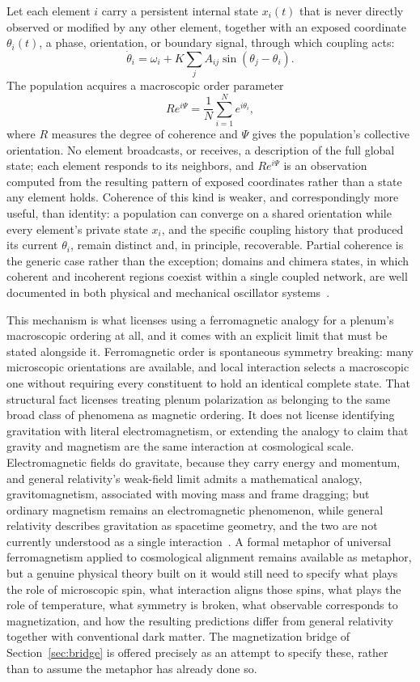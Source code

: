 \documentclass[11pt]{article}
\begin{document}
Let each element $i$ carry a persistent internal state $x_i(t)$ that is never directly observed or modified by any other element, together with an exposed coordinate $\theta_i(t)$, a phase, orientation, or boundary signal, through which coupling acts:
\[
\dot{\theta}_i = \omega_i + K\sum_j A_{ij}\sin(\theta_j - \theta_i).
\]
The population acquires a macroscopic order parameter
\[
Re^{i\Psi} = \frac{1}{N}\sum_{i=1}^{N} e^{i\theta_i},
\]
where $R$ measures the degree of coherence and $\Psi$ gives the population's collective orientation. No element broadcasts, or receives, a description of the full global state; each element responds to its neighbors, and $Re^{i\Psi}$ is an observation computed from the resulting pattern of exposed coordinates rather than a state any element holds. Coherence of this kind is weaker, and correspondingly more useful, than identity: a population can converge on a shared orientation while every element's private state $x_i$, and the specific coupling history that produced its current $\theta_i$, remain distinct and, in principle, recoverable. Partial coherence is the generic case rather than the exception; domains and chimera states, in which coherent and incoherent regions coexist within a single coupled network, are well documented in both physical and mechanical oscillator systems~\cite{panaggio2015}.

This mechanism is what licenses using a ferromagnetic analogy for a plenum's macroscopic ordering at all, and it comes with an explicit limit that must be stated alongside it. Ferromagnetic order is spontaneous symmetry breaking: many microscopic orientations are available, and local interaction selects a macroscopic one without requiring every constituent to hold an identical complete state. That structural fact licenses treating plenum polarization as belonging to the same broad class of phenomena as magnetic ordering. It does not license identifying gravitation with literal electromagnetism, or extending the analogy to claim that gravity and magnetism are the same interaction at cosmological scale. Electromagnetic fields do gravitate, because they carry energy and momentum, and general relativity's weak-field limit admits a mathematical analogy, gravitomagnetism, associated with moving mass and frame dragging; but ordinary magnetism remains an electromagnetic phenomenon, while general relativity describes gravitation as spacetime geometry, and the two are not currently understood as a single interaction~\cite{einsteinonline}. A formal metaphor of universal ferromagnetism applied to cosmological alignment remains available as metaphor, but a genuine physical theory built on it would still need to specify what plays the role of microscopic spin, what interaction aligns those spins, what plays the role of temperature, what symmetry is broken, what observable corresponds to magnetization, and how the resulting predictions differ from general relativity together with conventional dark matter. The magnetization bridge of Section~\ref{sec:bridge} is offered precisely as an attempt to specify these, rather than to assume the metaphor has already done so.
\end{document}
